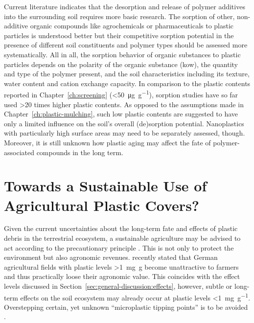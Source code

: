 Current literature indicates that the desorption and release of polymer additives into the surrounding soil requires more basic research. The sorption of other, non-additive organic compounds like agrochemicals or pharmaceuticals to plastic particles is understood better but their competitive sorption potential in the presence of different soil constituents and polymer types should be assessed more systematically. All in all, the sorption behavior of organic substances to plastic particles depends on the polarity of the organic substance (\ac{kow}), the quantity and type of the polymer present, and the soil characteristics including its texture, water content and cation exchange capacity.
In comparison to the plastic contents reported in Chapter~\ref{ch:screening} (\SI{<50}{\micro\gram\per\gram}), sorption studies have so far used \num{>20} times higher plastic contents. As opposed to the assumptions made in Chapter~\ref{ch:plastic-mulching}, such low plastic contents are suggested to have only a limited influence on the soil's overall (de)sorption potential. Nanoplastics with particularly high surface areas may need to be separately assessed, though. Moreover, it is still unknown how plastic aging may affect the fate of polymer-associated compounds in the long term.

\section{Towards a Sustainable Use of Agricultural Plastic Covers?}
\label{sec:general-discussion:sustainable}

Given the current uncertainties about the long-term fate and effects of plastic debris in the terrestrial ecosystem, a sustainable agriculture may be advised to act according to the precautionary principle \citep{RhodesPlastic2018,BackhausMicroplastics2020,MollerFinding2020}. This is not only to protect the environment but also agronomic revenues.  recently stated that German agricultural fields with plastic levels \SI{>1}{\milli\gram\gram} become unattractive to farmers and thus practically loose their agronomic value. This coincides with the effect levels discussed in Section~\ref{sec:general-discussion:effects}, however, subtle or long-term effects on the soil ecosystem may already occur at plastic levels \SI{<1}{\milli\gram\per\gram}. Overstepping certain, yet unknown ``microplastic tipping points'' is to be avoided \citep{QiBehavior2020}.

